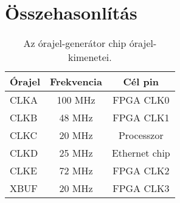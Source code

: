 \chapter{Összehasonlítás}

	\begin{table}[ht]
		\footnotesize
		\centering
		\caption{Az órajel-generátor chip órajel-kimenetei.} \label{tab:SysClocks}
		\begin{tabular}{ | l | c | c |}
		\hline
		Órajel & Frekvencia & Cél pin \\ \hline
		CLKA & 100 MHz & FPGA CLK0\\
		CLKB & 48 MHz  & FPGA CLK1\\
		CLKC & 20 MHz  & Processzor\\
		CLKD & 25 MHz  & Ethernet chip \\
		CLKE & 72 MHz  & FPGA CLK2\\
		XBUF & 20 MHz  & FPGA CLK3\\
		\hline
		\end{tabular}
		\label{tab:TabularExample}
	\end{table}








